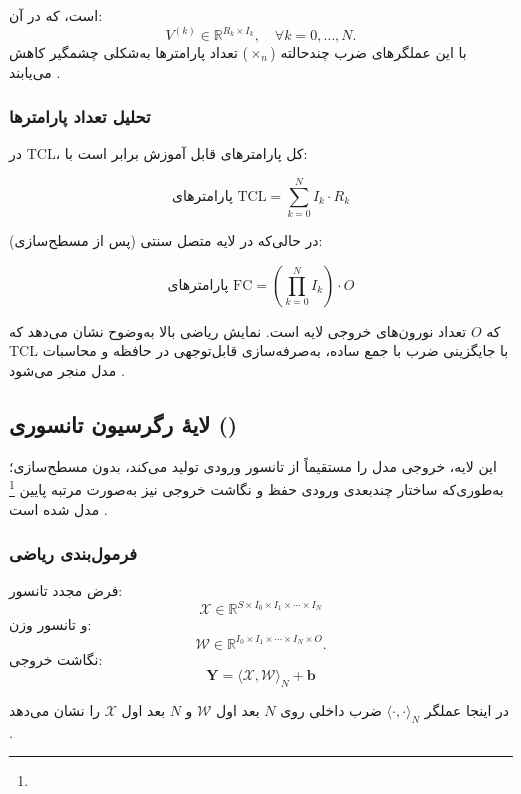 است، که در آن:
\[
V^{(k)} \in \mathbb{R}^{R_k \times I_k}, \quad \forall k = 0,\dots,N.
\]
با این عملگرهای ضرب چندحالته (\(\times_n\)) تعداد پارامترها به‌شکلی چشمگیر کاهش می‌یابند \cite{kossaifi2017tensorcontraction}.

\subsubsection*{تحلیل تعداد پارامترها}

در TCL، کل پارامترهای قابل آموزش برابر است با:

\begin{equation}
	\text{پارامترهای TCL} = \sum_{k=0}^{N} I_k \cdot R_k
\end{equation}

در حالی‌که در لایه متصل سنتی (پس از مسطح‌سازی):

\begin{equation}
	\text{پارامترهای FC} = \left(\prod_{k=0}^{N} I_k\right) \cdot O
\end{equation}

که \(O\) تعداد نورون‌های خروجی لایه است. نمایش ریاضی بالا به‌وضوح نشان می‌دهد که TCL با جایگزینی ضرب با جمع ساده، به‌صرفه‌سازی قابل‌توجهی در حافظه و محاسبات مدل منجر می‌شود \cite{kossaifi2017tensorcontraction,kossaifi2020tensorregression}.

\subsection{لایهٔ رگرسیون تانسوری ()}

این لایه، خروجی مدل را مستقیماً از تانسور ورودی تولید می‌کند، بدون مسطح‌سازی؛ به‌طوری‌که ساختار چندبعدی ورودی حفظ و نگاشت خروجی نیز به‌صورت مرتبه پایین \footnote{} مدل شده است \cite{kossaifi2020tensorregression}.

\subsubsection*{فرمول‌بندی ریاضی}

فرض مجدد تانسور:
\[
\mathcal{X} \in \mathbb{R}^{S \times I_0 \times I_1 \times \cdots \times I_N}
\]
و تانسور وزن:
\[
\mathcal{W} \in \mathbb{R}^{I_0 \times I_1 \times \cdots \times I_N \times O}.
\]
نگاشت خروجی:
\begin{equation}
	\mathbf{Y} = \langle \mathcal{X}, \mathcal{W} \rangle_N + \mathbf{b}
\end{equation}

در اینجا عملگر \(\langle \cdot,\cdot \rangle_N\) ضرب داخلی روی \(N\) بعد اول \(\mathcal{W}\) و \(N\) بعد اول \(\mathcal{X}\) را نشان می‌دهد \cite{kossaifi2020tensorregression}.

